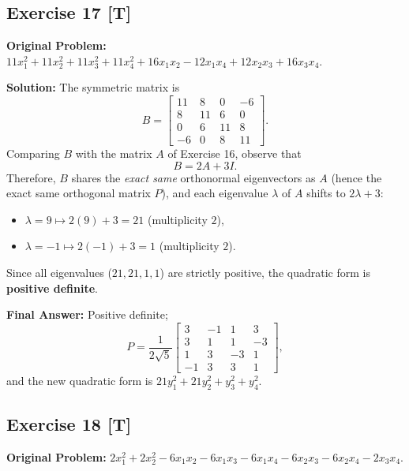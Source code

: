 \documentclass[11pt, letterpaper]{article}
\theoremstyle{definition}
\theoremstyle{remark}
\begin{document}
\hrulefill

\subsection*{Exercise 17 [T]}
\textbf{Original Problem:} $11x_1^2 + 11x_2^2 + 11x_3^2 + 11x_4^2 + 16x_1x_2 - 12x_1x_4 + 12x_2x_3 + 16x_3x_4$.

\textbf{Solution:}
The symmetric matrix is
\[
B = \begin{bmatrix} 11 & 8 & 0 & -6 \\ 8 & 11 & 6 & 0 \\ 0 & 6 & 11 & 8 \\ -6 & 0 & 8 & 11 \end{bmatrix}.
\]
Comparing $B$ with the matrix $A$ of Exercise 16, observe that
\[
B = 2A + 3I.
\]
Therefore, $B$ shares the \emph{exact same} orthonormal eigenvectors as $A$ (hence the exact same orthogonal matrix $P$), and each eigenvalue $\lambda$ of $A$ shifts to $2\lambda + 3$:
\begin{itemize}
    \item $\lambda = 9 \longmapsto 2(9) + 3 = 21$ (multiplicity $2$),
    \item $\lambda = -1 \longmapsto 2(-1) + 3 = 1$ (multiplicity $2$).
\end{itemize}
Since all eigenvalues ($21, 21, 1, 1$) are strictly positive, the quadratic form is \textbf{positive definite}.

\textbf{Final Answer:} Positive definite;
\[
P = \frac{1}{2\sqrt{5}}\begin{bmatrix}
3 & -1 & 1 & 3 \\
3 & 1 & 1 & -3 \\
1 & 3 & -3 & 1 \\
-1 & 3 & 3 & 1
\end{bmatrix},
\]
and the new quadratic form is $21y_1^2 + 21y_2^2 + y_3^2 + y_4^2$.

\hrulefill

\subsection*{Exercise 18 [T]}
\textbf{Original Problem:} $2x_1^2 + 2x_2^2 - 6x_1x_2 - 6x_1x_3 - 6x_1x_4 - 6x_2x_3 - 6x_2x_4 - 2x_3x_4$.
\end{document}
